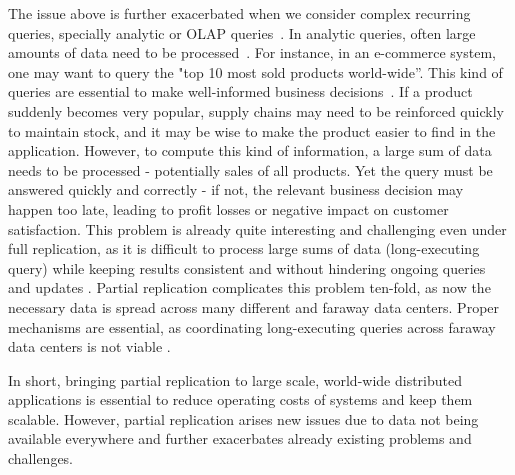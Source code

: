 The issue above is further exacerbated when we consider complex recurring queries, specially analytic or OLAP queries~\cite{dbtoaster,viewSelection,sioulas2023real}.
In analytic queries, often large amounts of data need to be processed~\cite{clickhouse, analyticdb}.
For instance, in an e-commerce system, one may want to query the "top 10 most sold products world-wide''.
This kind of queries are essential to make well-informed business decisions~\cite{clickhouse, hadad}.
If a product suddenly becomes very popular, supply chains may need to be reinforced quickly to maintain stock, and it may be wise to make the product easier to find in the application.
However, to compute this kind of information, a large sum of data needs to be processed - potentially sales of all products.
Yet the query must be answered quickly and correctly - if not, the relevant business decision may happen too late, leading to profit losses or negative impact on customer satisfaction.
This problem is already quite interesting and challenging even under full replication, as it is difficult to process large sums of data (long-executing query) while keeping results consistent and without hindering ongoing queries and updates \cite{analyticdb}.
Partial replication complicates this problem ten-fold, as now the necessary data is spread across many different and faraway data centers.
Proper mechanisms are essential, as coordinating long-executing queries across faraway data centers is not viable \cite{clickhouse}.

In short, bringing partial replication to large scale, world-wide distributed applications is essential to reduce operating costs of systems and keep them scalable.
However, partial replication arises new issues due to data not being available everywhere and further exacerbates already existing problems and challenges.


